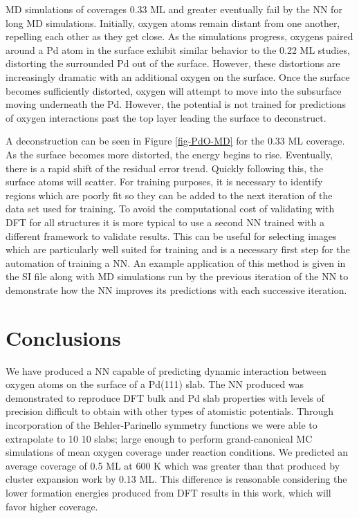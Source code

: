\documentclass[12pt]{cmuthesis}
\begin{document}
MD simulations of coverages 0.33 ML and greater eventually fail by the NN for long MD simulations. Initially, oxygen atoms remain distant from one another, repelling each other as they get close. As the simulations progress, oxygens paired around a Pd atom in the surface exhibit similar behavior to the 0.22 ML studies, distorting the surrounded Pd out of the surface. However, these distortions are increasingly dramatic with an additional oxygen on the surface. Once the surface becomes sufficiently distorted, oxygen will attempt to move into the subsurface moving underneath the Pd. However, the potential is not trained for predictions of oxygen interactions past the top layer leading the surface to deconstruct.

A deconstruction can be seen in Figure \ref{fig-PdO-MD} for the 0.33 ML coverage. As the surface becomes more distorted, the energy begins to rise. Eventually, there is a rapid shift of the residual error trend. Quickly following this, the surface atoms will scatter. For training purposes, it is necessary to identify regions which are poorly fit so they can be added to the next iteration of the data set used for training. To avoid the computational cost of validating with DFT for all structures it is more typical to use a second NN trained with a different framework to validate results. This can be useful for selecting images which are particularly well suited for training and is a necessary first step for the automation of training a NN. An example application of this method is given in the SI file along with MD simulations run by the previous iteration of the NN to demonstrate how the NN improves its predictions with each successive iteration.

\section{Conclusions}
\label{sec:org906612f}
We have produced a NN capable of predicting dynamic interaction between oxygen atoms on the surface of a Pd(111) slab. The NN produced was demonstrated to reproduce DFT bulk and Pd slab properties with levels of precision difficult to obtain with other types of atomistic potentials. Through incorporation of the Behler-Parinello symmetry functions we were able to extrapolate to 10 \texttimes{} 10 slabs; large enough to perform grand-canonical MC simulations of mean oxygen coverage under reaction conditions. We predicted an average coverage of 0.5 ML at 600 K which was greater than that produced by cluster expansion work by 0.13 ML. This difference is reasonable considering the lower formation energies produced from DFT results in this work, which will favor higher coverage.
\end{document}
